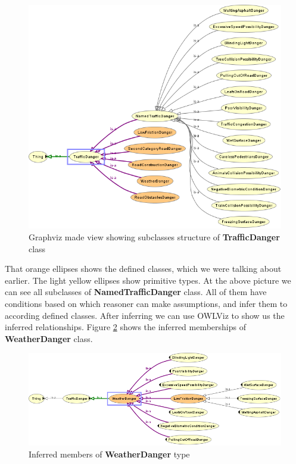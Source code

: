 \begin{figure}[htp]
\centering
\includegraphics[scale=0.7]{images/chapter3/TrafficDangerOwlViz}
\caption{Graphviz made view showing subclasses structure of \textbf{TrafficDanger} class}
\label{fig:trafficDangerOwlViz}
\end{figure}

\noindent That orange ellipses shows the defined classes, which we were talking about earlier. The light yellow ellipses show primitive types. At the above picture we can see all subclasses of \textbf{NamedTrafficDanger} class. All of them have conditions based on which reasoner can make assumptions, and infer them to according defined classes. After inferring we can use OWLViz to show us the inferred relationships. Figure \ref{fig:weatherDangerInferredOwlViz} shows the inferred memberships of \textbf{WeatherDanger} class.

\newpage

\begin{figure}[htp]
\centering
\includegraphics[scale=0.6]{images/chapter3/WeatherDangerInferredOwlViz}
\caption{Inferred members of \textbf{WeatherDanger} type}
\label{fig:weatherDangerInferredOwlViz}
\end{figure}


